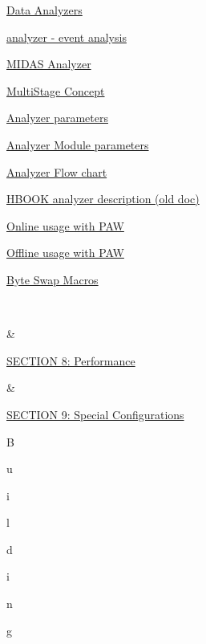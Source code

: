 \begin{TabularC}{2}
\begin{TabularC}{2}
\begin{DoxyItemize}
\item \hyperlink{DataAnalysis_DA_Data_analyzers}{Data Analyzers} 
\item \hyperlink{DataAnalysis_DA_analyzer_utility}{analyzer -\/ event analysis} 
\item \hyperlink{DataAnalysis_DA_Midas_Analyzer}{MIDAS Analyzer} 
\item \hyperlink{DataAnalysis_DA_Multi_Stage_Concept}{MultiStage Concept} 
\begin{DoxyItemize}
\item \hyperlink{DataAnalysis_Analyzer_parameters}{Analyzer parameters} 
\item \hyperlink{DataAnalysis_Analyzer_module_parameters}{Analyzer Module parameters} 
\item \hyperlink{DataAnalysis_Analyzer_flow_chart}{Analyzer Flow chart} 
\item \hyperlink{DataAnalysis_HBOOK_analyzer}{HBOOK analyzer description (old doc)} 
\item \hyperlink{DataAnalysis_PAW_Online_usage}{Online usage with PAW} 
\item \hyperlink{DataAnalysis_PAW_Offline_usage}{Offline usage with PAW} 
\end{DoxyItemize}
\item \hyperlink{DataAnalysis_DA_Byte_Swap_Macros}{Byte Swap Macros} 
\end{DoxyItemize}\\
\par
  &\label{O_Contents_Page_Performance_section_index}
\hypertarget{O_Contents_Page_Performance_section_index}{}
 \par
 \hyperlink{Performance}{SECTION 8: Performance}  \\
\par
  &\label{O_Contents_Page_SpecialConfig_section_index}
\hypertarget{O_Contents_Page_SpecialConfig_section_index}{}
 \par
 \hyperlink{SpecialConfig}{SECTION 9: Special Configurations}  \\
 \par
\par
\par
B\par
u\par
i\par
l\par
d\par
i\par
n\par
g\par

\end{TabularC}
\end{TabularC}
